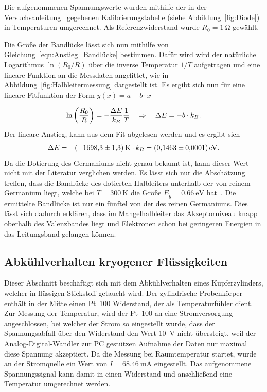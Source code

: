 \documentclass[parskip=half, a4paper,twoside,final]{article}
\begin{document}
Die aufgenommenen Spannungswerte wurden mithilfe der in der Versuchsanleitung~\cite{Thurk} gegebenen Kalibrierungstabelle (siehe Abbildung~\ref{fig:Diode}) in Temperaturen umgerechnet. Als Referenzwiderstand wurde $R_0 = \SI{1}{\ohm}$ gewählt.

Die Größe der Bandlücke lässt sich nun mithilfe von Gleichung~\eqref{eqn:Anstieg_Bandlücke} bestimmen. Dafür wird wird der natürliche Logarithmus $\ln(R_0/R)$ über die inverse Temperatur $1/T$ aufgetragen und eine lineare Funktion an die Messdaten angefittet, wie in Abbildung~\ref{fig:Halbleitermessung} dargestellt ist. Es ergibt sich nun für eine lineare Fitfunktion der Form $y(x) = a + b\cdot x$



\begin{align}
  \ln\qty(\frac{R_0}{R}) = - \frac{\Delta E}{k_B}\frac{1}{T} \quad \Rightarrow \quad \Delta E = - b \cdot k_B.
\end{align}
Der lineare Anstieg, kann aus dem Fit abgelesen werden und es ergibt sich
\begin{align}
  \Delta E = -\SI{-1698.3\pm 1.3}{\kelvin} \cdot k_B = \SI{0.1463\pm0.0001}{\electronvolt}.
\end{align}
Da die Dotierung des Germaniums nicht genau bekannt ist, kann dieser Wert nicht mit der Literatur verglichen werden. Es lässt sich nur die Abschätzung treffen, dass die Bandlücke des dotierten Halbleiters unterhalb der von reinem Germanium liegt, welche bei $T=\SI{300}{\kelvin}$ die Größe $E_g = \SI{0.66}{\electronvolt}$ hat~\cite{Hunklinger}. Die ermittelte Bandlücke ist nur ein fünftel von der des reinen Germaniums. Dies lässt sich dadurch erklären, dass im Mangelhalbleiter das Akzeptorniveau knapp oberhalb des Valenzbandes liegt und Elektronen schon bei geringeren Energien in das Leitungsband gelangen können.

\subsection{Abkühlverhalten kryogener Flüssigkeiten}

Dieser Abschnitt beschäftigt sich mit dem Abkühlverhalten eines Kupferzylinders, welcher in flüssigen Stickstoff getaucht wird. Der zylindrische Probenkörper enthält in der Mitte einen Pt~100 Widerstand, der als Temperaturfühler dient. Zur Messung der Temperatur, wird der Pt~100 an eine Stromversorgung angeschlossen, bei welcher der Strom so eingestellt wurde, dass der Spannungsabfall über den Widerstand den Wert \SI{10}{\volt} nicht übersteigt, weil der Analog-Digital-Wandler zur PC gestützen Aufnahme der Daten nur maximal diese Spannung akzeptiert. Da die Messung bei Raumtemperatur startet, wurde an der Stromquelle ein Wert von $I = \SI{68.46}{\milli\ampere}$ eingestellt. Das aufgenommene Spannungssignal kann damit in einen Widerstand und anschließend eine Temperatur umgerechnet werden.
\end{document}
